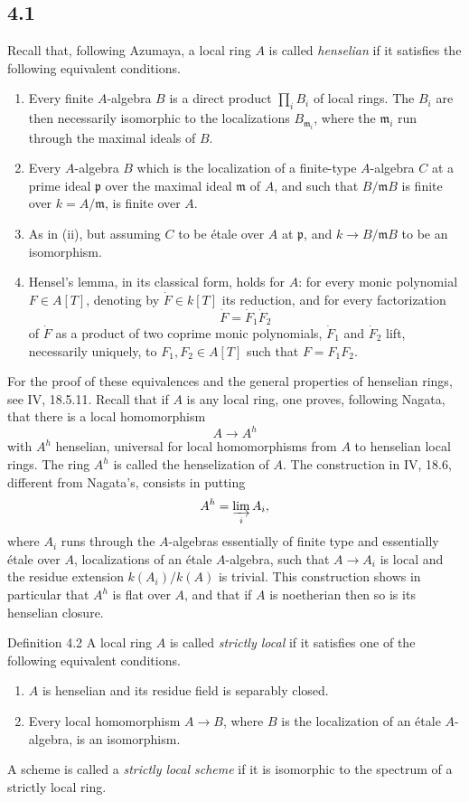 \subsection*{4.1}
Recall that, following Azumaya, a local ring \(A\) is called \emph{henselian} if it satisfies the following equivalent conditions.
\begin{enumerate}[label=(\roman*)]
\item Every finite \(A\)-algebra \(B\) is a direct product \(\prod_i B_i\) of local rings. The \(B_i\) are then necessarily isomorphic to the localizations \(B_{\mathfrak m_i}\), where the \(\mathfrak m_i\) run through the maximal ideals of \(B\).
\item Every \(A\)-algebra \(B\) which is the localization of a finite-type \(A\)-algebra \(C\) at a prime ideal \(\mathfrak p\) over the maximal ideal \(\mathfrak m\) of \(A\), and such that \(B/\mathfrak mB\) is finite over \(k=A/\mathfrak m\), is finite over \(A\).
\item As in (ii), but assuming \(C\) to be \'etale over \(A\) at \(\mathfrak p\), and \(k\to B/\mathfrak mB\) to be an isomorphism.
\item Hensel's lemma, in its classical form, holds for \(A\): for every monic polynomial \(F\in A[T]\), denoting by \(\dot F\in k[T]\) its reduction, and for every factorization
\[
\dot F=\dot F_1\dot F_2
\]
of \(\dot F\) as a product of two coprime monic polynomials, \(\dot F_1\) and \(\dot F_2\) lift, necessarily uniquely, to \(F_1,F_2\in A[T]\) such that \(F=F_1F_2\).
\end{enumerate}
For the proof of these equivalences and the general properties of henselian rings, see \EGA{} IV, 18.5.11. Recall that if \(A\) is any local ring, one proves, following Nagata, that there is a local homomorphism
\[
A\longrightarrow A^h
\]
with \(A^h\) henselian, universal for local homomorphisms from \(A\) to henselian local rings. The ring \(A^h\) is called the henselization of \(A\). The construction in \EGA{} IV, 18.6, different from Nagata's, consists in putting
\[
A^h=\varinjlim_i A_i,
\]
where \(A_i\) runs through the \(A\)-algebras essentially of finite type and essentially \'etale over \(A\), \ie localizations of an \'etale \(A\)-algebra, such that \(A\to A_i\) is local and the residue extension \(k(A_i)/k(A)\) is trivial. This construction shows in particular that \(A^h\) is flat over \(A\), and that if \(A\) is noetherian then so is its henselian closure.

\begin{statement}{Definition 4.2}
A local ring \(A\) is called \emph{strictly local} if it satisfies one of the following equivalent conditions.
\begin{enumerate}[label=(\roman*)]
\item \(A\) is henselian and its residue field is separably closed.
\item Every local homomorphism \(A\to B\), where \(B\) is the localization of an \'etale \(A\)-algebra, is an isomorphism.
\end{enumerate}
A scheme is called a \emph{strictly local scheme} if it is isomorphic to the spectrum of a strictly local ring.
\end{statement}

